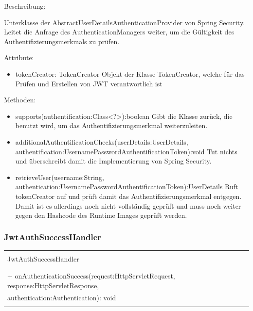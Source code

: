 \documentclass[a4paper,20pt,oneside]{book}
\begin{document}
	\vspace{0.5cm}
	\raggedright
	Beschreibung:
	
	Unterklasse der AbstractUserDetailsAuthenticationProvider von Spring Security. Leitet die Anfrage des AuthenticationManagers weiter, um die Gültigkeit des Authentifizierungsmerkmals zu prüfen.
	
	\vspace{0.5cm}
	Attribute:
	\begin{itemize}
	\item tokenCreator: TokenCreator\linebreak
	Objekt der Klasse TokenCreator, welche für das Prüfen und Erstellen von JWT verantwortlich ist
	\end{itemize}
	
	Methoden:
	\begin{itemize}
	\item supports(authentification:Class<?>):boolean\linebreak
	Gibt die Klasse zurück, die benutzt wird, um das Authentifizierungsmerkmal weiterzuleiten.
	\item additionalAuthentificationChecks(userDetails:UserDetails, authentification:UsernamePasswordAuthentificationToken):void\linebreak
	Tut nichts und überschreibt damit die Implementierung von Spring Security.
	\item retrieveUser(username:String, authentication:UsernamePasswordAuthentificationToken):UserDetails\linebreak
	Ruft tokenCreator auf und prüft damit das Authentifizierungsmerkmal entgegen. Damit ist es allerdings noch nicht vollständig geprüft und muss noch weiter gegen den Hashcode des Runtime Images geprüft werden.
	\end{itemize}
	
	\subsubsection{JwtAuthSuccessHandler}
\centering
	\begin{tabular}{|l|}
	\hline \\
	JwtAuthSuccessHandler\\
	 \hline \\
	
	 \hline \\
	+ onAuthenticationSuccess(request:HttpServletRequest, response:HttpServletResponse,\\ authentication:Authentication): void\\
	
	\\ 
	 \hline
	\end{tabular}
		 
\end{document}
